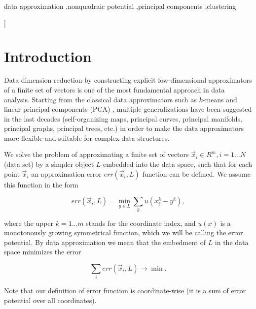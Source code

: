 \documentclass[preprint,12pt,twocolumn]{elsarticle}
\begin{document}
{\begin{frontmatter}
\begin{keyword}
data approximation \sep nonquadraic potential \sep principal components \sep clustering


\end{keyword}

\end{frontmatter}

}]


\section{Introduction}
\label{S:1}

Data dimension reduction by constructing explicit low-dimensional approximators of a finite set of vectors is one of the most fundamental approach in data analysis. Starting from the classical data approximators such as $k$-means and linear principal components (PCA) \cite{Pearson1901On}, multiple generalizations have been suggested in the last decades (self-organizing maps, principal curves, principal manifolds, principal graphs, principal trees, etc.)\cite{Gorban2009,Gorban2008Principal} in order to make the data approximators more flexible and suitable for complex data structures.

We solve the problem of approximating a finite set of vectors ${\vec{x}_i}\in R^m,i=1...N$ (data set) by a simpler object $L$ embedded into the data space, such that for each point $\vec{x}_i$ an approximation error $err(\vec{x}_i,L)$ function can be defined. We assume this function in the form

\begin{equation}\label{distance_function}
err(\vec{x}_i,L) = \min_{y\in L} \sum_k u(x_i^k-y^k),
\end{equation}

\noindent where the upper $k=1...m$ stands for the coordinate index, and $u(x)$ is a monotonously growing symmetrical function, which we will be calling the error potential. By data approximation we mean that the embedment of $L$ in the data space minimizes the error

$$
\sum_i err(\vec{x}_i,L) \rightarrow \min.
$$

Note that our definition of error function is coordinate-wise (it is a sum of error potential over all coordinates).
\end{document}
